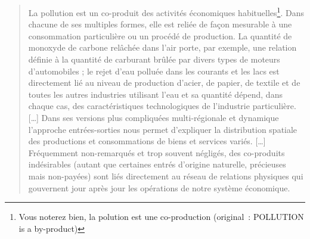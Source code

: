 \blockcquote[traduction]{leontief_environmental_1970}{
La pollution est un co-produit des activités économiques habituelles\footnote{Vous noterez bien, la polution est une co-production (original~: POLLUTION is a by-product)}.
Dans chacune de ses multiples formes, elle est reliée de façon mesurable à une consommation particulière ou un procédé de production.
La quantité de monoxyde de carbone relâchée dans l'air porte, par exemple, une relation définie à la quantité de carburant brûlée par divers types de moteurs d'automobiles ; le rejet d'eau polluée dans les courants et les lacs est directement lié au niveau de production d'acier, de papier, de textile et de toutes les autres industries utilisant l'eau et sa quantité dépend, dans chaque cas, des caractéristiques technologiques de l'industrie particulière.
[\ldots]
Dans ses versions plus compliquées multi-régionale et dynamique l'approche entrées-sorties nous permet d'expliquer la distribution spatiale des productions et consommations de biens et services variés.
[\ldots]
Fréquemment non-remarqués et trop souvent négligés, des co-produits indésirables (autant que certaines entrés d'origine naturelle, précieuses mais non-payées) sont liés directement au réseau de relations physiques qui gouvernent jour après jour les opérations de notre système économique.
}

